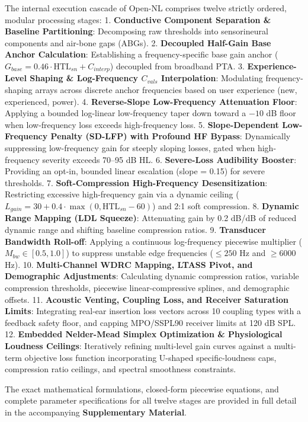 \documentclass[
  12pt,
]{article}
\begin{document}
The internal execution cascade of Open-NL comprises twelve strictly
ordered, modular processing stages: 1. \textbf{Conductive Component
Separation \& Baseline Partitioning}: Decomposing raw thresholds into
sensorineural components and air-bone gaps (ABGs). 2. \textbf{Decoupled
Half-Gain Base Anchor Calculation}: Establishing a frequency-specific
base gain anchor
(\(G_{base} = 0.46 \cdot \text{HTL}_{sn} + C_{interp}\)) decoupled from
broadband PTA. 3. \textbf{Experience-Level Shaping \& Log-Frequency
\(C_{vals}\) Interpolation}: Modulating frequency-shaping arrays across
discrete anchor frequencies based on user experience (new, experienced,
power). 4. \textbf{Reverse-Slope Low-Frequency Attenuation Floor}:
Applying a bounded log-linear low-frequency taper down toward a \(-10\)
dB floor when low-frequency loss exceeds high-frequency loss. 5.
\textbf{Slope-Dependent Low-Frequency Penalty (SD-LFP) with Profound HF
Bypass}: Dynamically suppressing low-frequency gain for steeply sloping
losses, gated when high-frequency severity exceeds 70--95 dB HL. 6.
\textbf{Severe-Loss Audibility Booster}: Providing an opt-in, bounded
linear escalation (slope = 0.15) for severe thresholds. 7.
\textbf{Soft-Compression High-Frequency Desensitization}: Restricting
excessive high-frequency gain via a dynamic ceiling
(\(L_{gain} = 30 + 0.4 \cdot \max(0, \text{HTL}_{sn} - 60)\)) and 2:1
soft compression. 8. \textbf{Dynamic Range Mapping (LDL Squeeze)}:
Attenuating gain by 0.2 dB/dB of reduced dynamic range and shifting
baseline compression ratios. 9. \textbf{Transducer Bandwidth Roll-off}:
Applying a continuous log-frequency piecewise multiplier
(\(M_{bw} \in [0.5, 1.0]\)) to suppress unstable edge frequencies
(\(\le 250\) Hz and \(\ge 6000\) Hz). 10. \textbf{Multi-Channel WDRC
Mapping, LTASS Pivot, and Demographic Adjustments}: Calculating dynamic
compression ratios, variable compression thresholds, piecewise
linear-compressive splines, and demographic offsets. 11.
\textbf{Acoustic Venting, Coupling Loss, and Receiver Saturation
Limits}: Integrating real-ear insertion loss vectors across 10 coupling
types with a feedback safety floor, and capping MPO/SSPL90 receiver
limits at 120 dB SPL. 12. \textbf{Embedded Nelder-Mead Simplex
Optimization \& Physiological Loudness Ceilings}: Iteratively refining
multi-level gain curves against a multi-term objective loss function
incorporating U-shaped specific-loudness caps, compression ratio
ceilings, and spectral smoothness constraints.

The exact mathematical formulations, closed-form piecewise equations,
and complete parameter specifications for all twelve stages are provided
in full detail in the accompanying \textbf{Supplementary Material}.
\end{document}
